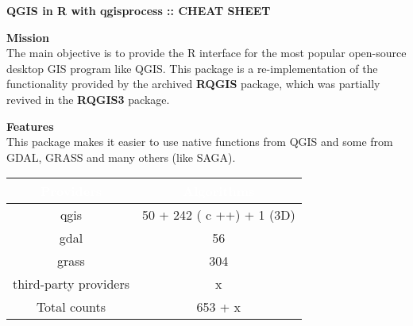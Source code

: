 \documentclass{article}
\begin{document}
\pagestyle{footerstyle}
\begin{flushleft}
  \begin{adjustbox}{width=850pt}
    \fontsize{40}{30}\selectfont\textbf{QGIS in R with qgisprocess :: CHEAT SHEET}
  \end{adjustbox}
\end{flushleft}


\begin{multicols*}{3}
\setlength{\columnsep}{400pt}

\begin{minipage}{\linewidth}
  \vspace{-5pt}
   \textbf{\fontsize{44}{44}\selectfont \textbf{Mission}}\vspace{8pt}\\ 
  The main objective is to provide the R interface for the most popular open-source desktop GIS program like QGIS. This package is a re-implementation of the functionality provided by the archived \textbf{RQGIS} package, which was partially revived in the \textbf{RQGIS3} package.
\end{minipage}

\begin{minipage}{\linewidth}
  \vspace{12pt}
   \textbf{\fontsize{20}{5}\selectfont \textbf{Features}}\vspace{8pt}\\ 
  This package makes it easier to use native functions from QGIS and some from GDAL, GRASS and many others (like SAGA).

\begin{center}
\setlength{\arrayrulewidth}{0.001pt} 
\renewcommand{\arraystretch}{1.25} 
\begin{tabular}{|c|c|}
  \hline
  \rowcolor{mycolor} 
  \textcolor{white}{\textbf{Providers}} & \textcolor{white}{\textbf{Algorithms}} \\
  \hline
  qgis &  50 + 242 ( c ++) + 1 (3D) \\
  \hline
  gdal & 56 \\
  \hline
  grass & 304 \\
  \hline
  third-party providers & x \\
  \hline
  Total counts & 653 + x \\
  \hline
\end{tabular}
\end{center}  
\end{minipage}


\end{multicols*}
\end{document}
